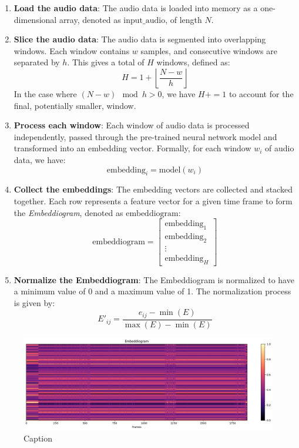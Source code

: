 \begin{enumerate}
\item \textbf{Load the audio data}: The audio data is loaded into memory as a one-dimensional array, denoted as $\text{input\_audio}$, of length $N$.

\item \textbf{Slice the audio data}: The audio data is segmented into overlapping windows. Each window contains $w$ samples, and consecutive windows are separated by $h$. This gives a total of $H$ windows, defined as:
\begin{equation}
H = 1 + \left\lfloor \frac{N - w}{h} \right\rfloor
\end{equation}
In the case where $\left( N - w \right) \mod h > 0$, we have $H += 1$ to account for the final, potentially smaller, window.

\item \textbf{Process each window}: Each window of audio data is processed independently, passed through the pre-trained neural network model and transformed into an embedding vector. Formally, for each window $w_i$ of audio data, we have:
\begin{equation}
\text{embedding}_i = \text{model}(w_i)
\end{equation}

\item \textbf{Collect the embeddings}: The embedding vectors are collected and stacked together. Each row represents a feature vector for a given time frame to form the \textit{Embeddiogram}, denoted as $\text{embeddiogram}$:
\begin{equation}
\text{embeddiogram} = \begin{bmatrix} \text{embedding}_1 \\ \text{embedding}_2 \\ \vdots \\ \text{embedding}_H \end{bmatrix}
\end{equation}

\item \textbf{Normalize the Embeddiogram}: The Embeddiogram is normalized to have a minimum value of 0 and a maximum value of 1. The normalization process is given by:
\begin{equation}
E'_{ij} = \frac{e_{ij} - \min(E)}{\max(E) - \min(E)}
\end{equation}
\end{enumerate}

\begin{figure}
    \centering
    \includegraphics[width=\textwidth]{figures/images/embeddiogram_SALAMI_track_2.png}
    \caption[Embeddiogram]{Caption}
    \label{fig:embeddiogram}
\end{figure}
